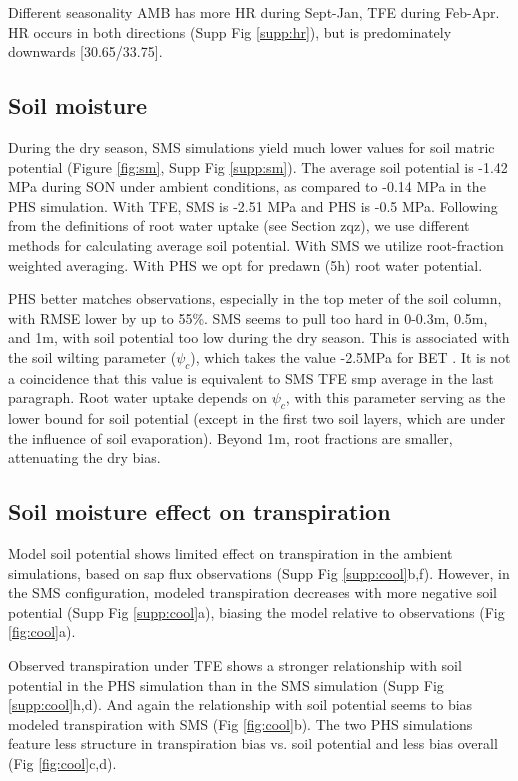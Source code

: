 \documentclass[draft,linenumbers]{agujournal}
\begin{document}
    Different seasonality AMB has more HR during Sept-Jan, TFE during Feb-Apr.
    HR occurs in both directions (Supp Fig \ref{supp:hr}), but is predominately downwards [30.65/33.75].

\subsection{Soil moisture}
    During the dry season, SMS simulations yield much lower values for soil matric potential (Figure \ref{fig:sm}, Supp Fig \ref{supp:sm}). 
    The average soil potential  is -1.42 MPa during SON under ambient conditions, as compared to -0.14 MPa in the PHS simulation.
    With TFE, SMS is -2.51 MPa and PHS is -0.5 MPa.
    Following from the definitions of root water uptake (see Section zqz), we use different methods for calculating average soil potential.
    With SMS we utilize root-fraction weighted averaging.
    With PHS we opt for predawn (5h) root water potential. 

    PHS better matches observations, especially in the top meter of the soil column, with RMSE lower by up to 55\%.
    SMS seems to pull too hard in 0-0.3m, 0.5m, and 1m, with soil potential too low during the dry season.
    This is associated with the soil wilting parameter ($\psi_c$), which takes the value -2.5MPa for BET \citep{oleson2013}.
    It is not a coincidence that this value is equivalent to SMS TFE smp average in the last paragraph.
    Root water uptake depends on $\psi_c$, with this parameter serving as the lower bound for soil potential 
    (except in the first two soil layers, which are under the influence of soil evaporation).
    Beyond 1m, root fractions are smaller, attenuating the dry bias.
    
\subsection{Soil moisture effect on transpiration}    
    Model soil potential shows limited effect on transpiration in the ambient simulations, 
    based on sap flux observations (Supp Fig \ref{supp:cool}b,f).
    However, in the SMS configuration, modeled transpiration decreases with more negative soil potential (Supp Fig \ref{supp:cool}a),
    biasing the model relative to observations (Fig \ref{fig:cool}a).
    
    Observed transpiration under TFE shows a stronger relationship with soil potential in the 
    PHS simulation than in the SMS simulation (Supp Fig \ref{supp:cool}h,d).
    And again the relationship with soil potential seems to bias modeled transpiration with SMS (Fig \ref{fig:cool}b).
    The two PHS simulations feature less structure in transpiration bias vs. soil potential and less bias overall (Fig \ref{fig:cool}c,d).
\end{document}
